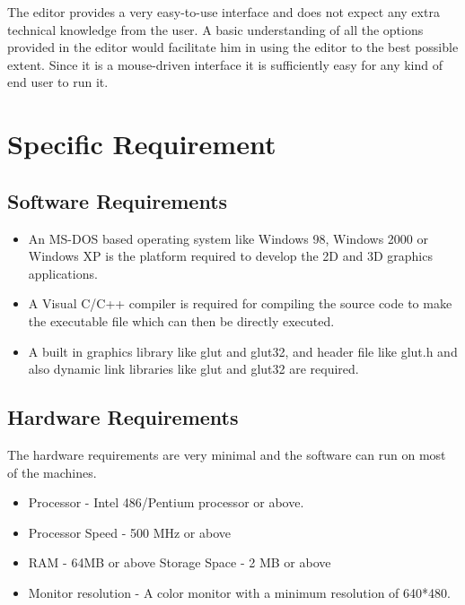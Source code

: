 \documentclass[12pt]{report}
\begin{document}
The editor provides a very easy-to-use interface and does not expect any extra technical knowledge from the user. A basic understanding of all the options provided in the editor would facilitate him in using the editor to the best possible extent. Since it is a mouse-driven interface it is sufficiently easy for any kind of end user to run it. 

\section{Specific Requirement}


\subsection{Software Requirements}

\begin{itemize}
\item{}	An MS-DOS based operating system like Windows 98, Windows 2000 or Windows XP is the platform required to develop the 2D and 3D graphics applications.
\item{}	A Visual C/C++ compiler is required for compiling the source code to make the executable file which can then be directly executed.
\item{}	A built in graphics library like glut and glut32, and header file like glut.h and also dynamic link libraries like glut and glut32 are required.
\end{itemize}
\subsection{Hardware Requirements}
The hardware requirements are very minimal and the software can run on most of the machines. 
\begin{itemize}
\item{}	Processor - Intel 486/Pentium processor or above.
\item{}	Processor Speed - 500 MHz or above 
\item{}	RAM - 64MB or above Storage Space - 2 MB or above 
\item{}	Monitor resolution - A color monitor with a minimum resolution of 640*480.

\end{itemize}



\pagestyle{fancy}
\chead{}
\rfoot{\small{\thepage}}
\renewcommand{\headrulewidth}{0.4pt}
\renewcommand{\footrulewidth}{0.4pt}
\end{document}
